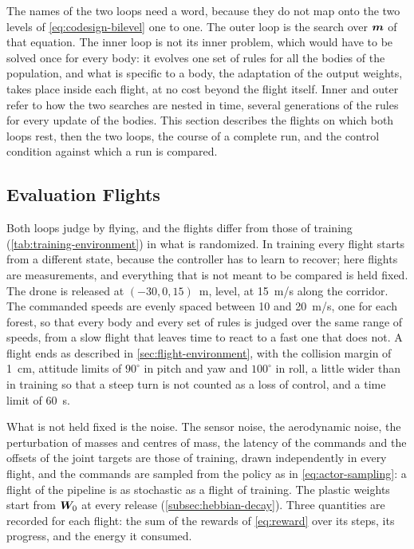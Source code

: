 The names of the two loops need a word, because they do not map onto the two levels of \eqref{eq:codesign-bilevel} one to one. The outer loop is the search over $\bm{m}$ of that equation. The inner loop is not its inner problem, which would have to be solved once for every body: it evolves one set of rules for all the bodies of the population, and what is specific to a body, the adaptation of the output weights, takes place inside each flight, at no cost beyond the flight itself. Inner and outer refer to how the two searches are nested in time, several generations of the rules for every update of the bodies. This section describes the flights on which both loops rest, then the two loops, the course of a complete run, and the control condition against which a run is compared.

\subsection{Evaluation Flights}
\label{subsec:evaluation-flights}

Both loops judge by flying, and the flights differ from those of training (\autoref{tab:training-environment}) in what is randomized. In training every flight starts from a different state, because the controller has to learn to recover; here flights are measurements, and everything that is not meant to be compared is held fixed. The drone is released at $(-30, 0, 15)$~m, level, at 15~m/s along the corridor. The commanded speeds are evenly spaced between 10 and 20~m/s, one for each forest, so that every body and every set of rules is judged over the same range of speeds, from a slow flight that leaves time to react to a fast one that does not. A flight ends as described in \autoref{sec:flight-environment}, with the collision margin of 1~cm, attitude limits of $90^{\circ}$ in pitch and yaw and $100^{\circ}$ in roll, a little wider than in training so that a steep turn is not counted as a loss of control, and a time limit of 60~s.

What is not held fixed is the noise. The sensor noise, the aerodynamic noise, the perturbation of masses and centres of mass, the latency of the commands and the offsets of the joint targets are those of training, drawn independently in every flight, and the commands are sampled from the policy as in \eqref{eq:actor-sampling}: a flight of the pipeline is as stochastic as a flight of training. The plastic weights start from $\bm{W}_0$ at every release (\autoref{subsec:hebbian-decay}). Three quantities are recorded for each flight: the sum of the rewards of \eqref{eq:reward} over its steps, its progress, and the energy it consumed.

